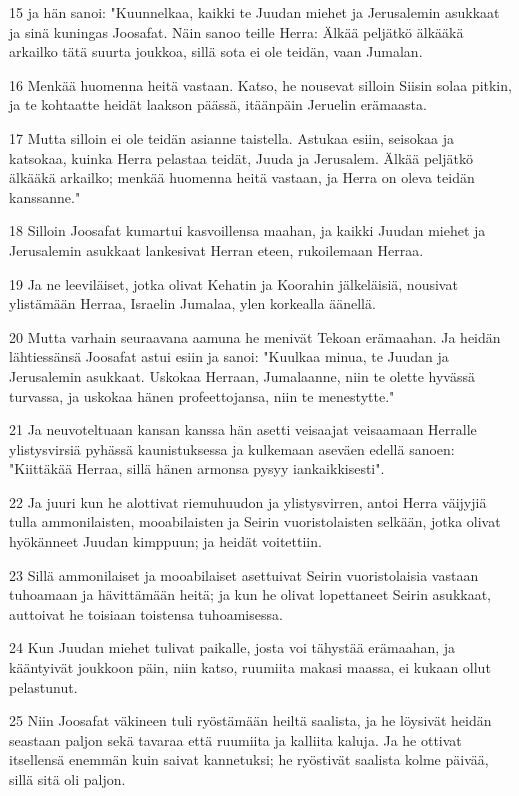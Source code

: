 \par 15 ja hän sanoi: "Kuunnelkaa, kaikki te Juudan miehet ja Jerusalemin asukkaat ja sinä kuningas Joosafat. Näin sanoo teille Herra: Älkää peljätkö älkääkä arkailko tätä suurta joukkoa, sillä sota ei ole teidän, vaan Jumalan.
\par 16 Menkää huomenna heitä vastaan. Katso, he nousevat silloin Siisin solaa pitkin, ja te kohtaatte heidät laakson päässä, itäänpäin Jeruelin erämaasta.
\par 17 Mutta silloin ei ole teidän asianne taistella. Astukaa esiin, seisokaa ja katsokaa, kuinka Herra pelastaa teidät, Juuda ja Jerusalem. Älkää peljätkö älkääkä arkailko; menkää huomenna heitä vastaan, ja Herra on oleva teidän kanssanne."
\par 18 Silloin Joosafat kumartui kasvoillensa maahan, ja kaikki Juudan miehet ja Jerusalemin asukkaat lankesivat Herran eteen, rukoilemaan Herraa.
\par 19 Ja ne leeviläiset, jotka olivat Kehatin ja Koorahin jälkeläisiä, nousivat ylistämään Herraa, Israelin Jumalaa, ylen korkealla äänellä.
\par 20 Mutta varhain seuraavana aamuna he menivät Tekoan erämaahan. Ja heidän lähtiessänsä Joosafat astui esiin ja sanoi: "Kuulkaa minua, te Juudan ja Jerusalemin asukkaat. Uskokaa Herraan, Jumalaanne, niin te olette hyvässä turvassa, ja uskokaa hänen profeettojansa, niin te menestytte."
\par 21 Ja neuvoteltuaan kansan kanssa hän asetti veisaajat veisaamaan Herralle ylistysvirsiä pyhässä kaunistuksessa ja kulkemaan aseväen edellä sanoen: "Kiittäkää Herraa, sillä hänen armonsa pysyy iankaikkisesti".
\par 22 Ja juuri kun he alottivat riemuhuudon ja ylistysvirren, antoi Herra väijyjiä tulla ammonilaisten, mooabilaisten ja Seirin vuoristolaisten selkään, jotka olivat hyökänneet Juudan kimppuun; ja heidät voitettiin.
\par 23 Sillä ammonilaiset ja mooabilaiset asettuivat Seirin vuoristolaisia vastaan tuhoamaan ja hävittämään heitä; ja kun he olivat lopettaneet Seirin asukkaat, auttoivat he toisiaan toistensa tuhoamisessa.
\par 24 Kun Juudan miehet tulivat paikalle, josta voi tähystää erämaahan, ja kääntyivät joukkoon päin, niin katso, ruumiita makasi maassa, ei kukaan ollut pelastunut.
\par 25 Niin Joosafat väkineen tuli ryöstämään heiltä saalista, ja he löysivät heidän seastaan paljon sekä tavaraa että ruumiita ja kalliita kaluja. Ja he ottivat itsellensä enemmän kuin saivat kannetuksi; he ryöstivät saalista kolme päivää, sillä sitä oli paljon.

